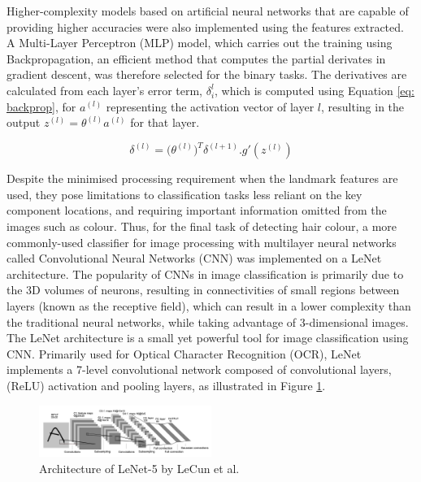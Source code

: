 \documentclass[conference]{IEEEtran}
\begin{document}
Higher-complexity models based on artificial neural networks that are capable of providing higher accuracies were also implemented using the features extracted. A Multi-Layer Perceptron (MLP) model, which carries out the training using Backpropagation, an efficient method that computes the partial derivates in gradient descent, was therefore selected for the binary tasks. The derivatives are calculated from each layer's error term, $\delta_i^l$, which is computed using Equation \ref{eq: backprop}, for $a^{(l)}$ representing the activation vector of layer $l$, resulting in the output $z^{(l)} = \theta^{(l)} a^{(l)}$ for that layer.

\begin{equation}
\delta^{(l)} = \big(\theta^{(l)}\big)^T \delta^{(l+1)}.g'(z^{(l)})
\label{eq: backprop}
\end{equation}

Despite the minimised processing requirement when the landmark features are used, they pose limitations to classification tasks less reliant on the key component locations, and requiring important information omitted from the images such as colour. Thus, for the final task of detecting hair colour, a more commonly-used classifier for image processing with multilayer neural networks called Convolutional Neural Networks (CNN) was implemented on a LeNet architecture. The popularity of CNNs in image classification is primarily due to the 3D volumes of neurons, resulting in connectivities of small regions between layers (known as the receptive field), which can result in a lower complexity than the traditional neural networks, while taking advantage of 3-dimensional images. 
The LeNet architecture is a small yet powerful tool for image classification using CNN. Primarily used for Optical Character Recognition (OCR), LeNet implements a 7-level convolutional network composed of convolutional layers, (ReLU) activation and pooling layers, as illustrated in Figure \ref{fig: LeNet}.

\begin{figure} [h] %
  \centering
    \includegraphics[width=0.5\textwidth]{graphs/LeNet} 
    \caption{Architecture of LeNet-5 by LeCun et al. \cite{LeCun}}
    \label{fig: LeNet}
\end{figure}
\end{document}
